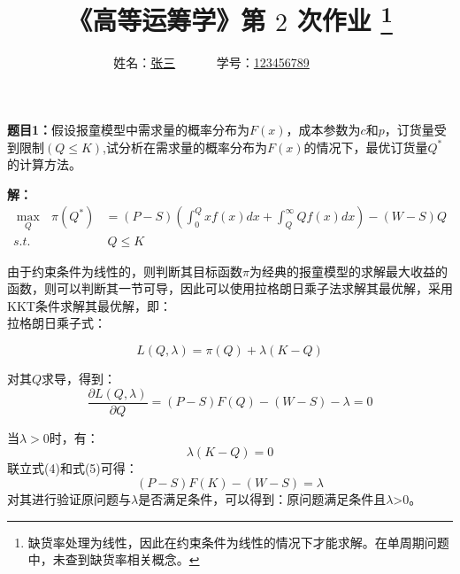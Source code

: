 \documentclass[12pt,a4paper]{article}
\begin{document}
\title{
{\heiti《高等运筹学》第 {$2$} 次作业
\footnote{
 缺货率处理为线性，因此在约束条件为线性的情况下才能求解。在单周期问题中，未查到缺货率相关概念。
}
}
}
\date{}

\author{
姓名：\underline{张三}~~~~~~
学号：\underline{123456789}~~~~~~}

\maketitle

\noindent
\section*{\heiti \color{red}{报童模型拓展}}
\noindent
{\bf 题目1：}假设报童模型中需求量的概率分布为$F(x)$，成本参数为$c$和$p$，订货量受到限制$(Q\leq K)$,试分析在需求量的概率分布为$F(x)$的情况下，最优订货量$Q^*$的计算方法。



\vspace{5pt}
\noindent
{\bf 解：}
\begin{align}
    \max_Q\text{\ }\pi \left( Q^{*} \right) &=\left( P-S \right) \left( \int_0^Q{xf\left( x \right) dx+\int_Q^{\infty}{Qf\left( x \right) dx}} \right) -\left( W-S \right) Q \\
    s.t.&\ Q\le K
\end{align}


由于约束条件为线性的，则判断其目标函数$\pi $为经典的报童模型的求解最大收益的函数，则可以判断其一节可导，因此可以使用拉格朗日乘子法求解其最优解，采用KKT条件求解其最优解，即：\\
拉格朗日乘子式：

\begin{equation}
    L\left( Q,\lambda  \right) =\pi \left( Q \right) +\lambda \left( K-Q \right)
\end{equation}

对其$Q$求导，得到：
\begin{equation}
    \frac{\partial L\left( Q,\lambda  \right)}{\partial Q} =\left( P-S \right) F\left( Q\right) -\left( W-S \right) -\lambda =0
\end{equation}

当$\lambda >0$时，有：
\begin{equation}
    \lambda \left( K-Q \right) =0   
\end{equation}
联立式(4)和式(5)可得：
\begin{equation}
    \left( P-S \right) F\left( K\right) -\left( W-S \right) =\lambda              
\end{equation}
对其进行验证原问题与$\lambda$是否满足条件，可以得到：原问题满足条件且$\lambda$>0。
\end{document}
